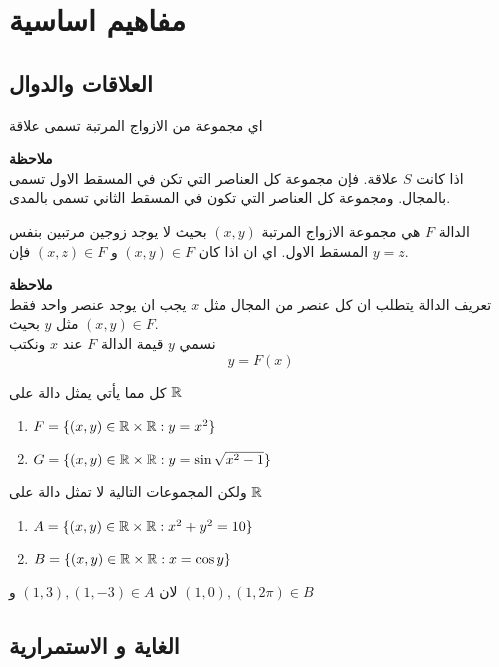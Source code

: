 \chapter{مفاهيم اساسية}

\section{العلاقات والدوال}
\begin{definition}
	اي مجموعة من الازواج المرتبة تسمى علاقة
\end{definition}
\noindent
\textbf{ملاحظة}\\
اذا كانت $S$ علاقة. فإن مجموعة كل العناصر التي تكن في المسقط الاول تسمى بالمجال. ومجموعة كل العناصر التي  تكون في المسقط الثاني تسمى بالمدى.

\begin{definition}
	الدالة $F$ هي مجموعة الازواج المرتبة $(x, y)$ بحيث لا يوجد زوجين مرتبين بنفس المسقط الاول. اي ان اذا كان
	$(x, y) \in F$ و $(x,z) \in F$
	فإن  $y=z$.
\end{definition}
\noindent
\textbf{ملاحظة}\\
تعريف الدالة يتطلب ان كل عنصر من المجال مثل $x$ يجب ان يوجد عنصر واحد فقط  مثل $y$ بحيث $(x,y)\in F$.\\
نسمي $y$ قيمة الدالة $F$ عند $x$ ونكتب
\[
y = F(x)
\] 

\begin{example}
	كل مما يأتي يمثل دالة على $\mathbb{R}$
	\begin{english}
			\begin{enumerate}[label=$\bullet$]
			\item $F=\{(x, y)\in \mathbb{R}\times\mathbb{R} : y = x^2\}$
			\item $G=\{(x, y)\in \mathbb{R}\times\mathbb{R} : y = \sin \sqrt{x^2-1}\}$
		\end{enumerate}
	\end{english}
ولكن المجموعات التالية لا تمثل دالة على $\mathbb{R}$
	\begin{english}
			\begin{enumerate}[label=$\bullet$]
		\item $A=\{(x, y)\in \mathbb{R}\times\mathbb{R} : x^2 + y^2 = 10\}$
		\item $B=\{(x, y)\in \mathbb{R}\times\mathbb{R} : x = \cos y\}$
	\end{enumerate}
\end{english}
لان 
$(1,3), (1,-3) \in A$
و
$(1, 0), (1, 2\pi) \in B$
\end{example}

\newpage
\section{الغاية و الاستمرارية}

